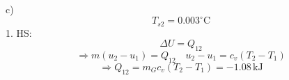 c) 
\[
T_{s2} = 0.003^\circ \text{C}
\]
1. HS: 
\[
\Delta U = Q_{12}
\]
\[
\Rightarrow m (u_2 - u_1) = Q_{12} \quad u_2 - u_1 = c_v (T_2 - T_1)
\]
\[
\Rightarrow Q_{12} = m_G c_v (T_2 - T_1) = -1.08 \, \text{kJ}
\]